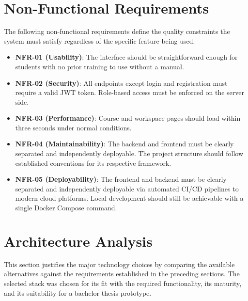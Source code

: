 \section{Non-Functional Requirements}
\label{sec:nonfunctional-requirements}

The following non-functional requirements define the quality constraints the system must satisfy
regardless of the specific feature being used.

\begin{itemize}
    \item \textbf{NFR-01 (Usability)}: The interface should be straightforward enough for
          students with no prior training to use without a manual.
    \item \textbf{NFR-02 (Security)}: All endpoints except login and registration must
          require a valid JWT token. Role-based access must be enforced on the server side.
    \item \textbf{NFR-03 (Performance)}: Course and workspace pages should load within
          three seconds under normal conditions.
    \item \textbf{NFR-04 (Maintainability)}: The backend and frontend must be clearly
          separated and independently deployable. The project structure should
          follow established conventions for its respective framework.
    \item \textbf{NFR-05 (Deployability)}: The frontend and backend must be clearly
          separated and independently deployable via automated CI/CD pipelines to
          modern cloud platforms. Local development should still be achievable with
          a single Docker Compose command.
\end{itemize}

\section{Architecture Analysis}
\label{sec:architecture-analysis}
\label{sec:technologies}

This section justifies the major technology choices by comparing the available alternatives against the requirements established in the preceding sections. The selected stack was chosen for its fit with the required functionality, its maturity, and its suitability for a bachelor thesis prototype.

